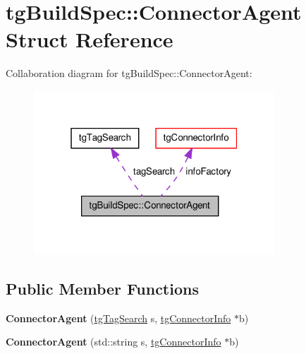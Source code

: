 \hypertarget{structtg_build_spec_1_1_connector_agent}{\section{tg\-Build\-Spec\-:\-:Connector\-Agent Struct Reference}
\label{structtg_build_spec_1_1_connector_agent}
}


Collaboration diagram for tg\-Build\-Spec\-:\-:Connector\-Agent\-:\nopagebreak
\begin{figure}[H]
\begin{center}
\leavevmode
\includegraphics[width=256pt]{structtg_build_spec_1_1_connector_agent__coll__graph}
\end{center}
\end{figure}
\subsection*{Public Member Functions}
\begin{DoxyCompactItemize}
\item 
\hypertarget{structtg_build_spec_1_1_connector_agent_a492d3ea5402b53ad66f2aec8d4ff47a7}{{\bfseries Connector\-Agent} (\hyperlink{classtg_tag_search}{tg\-Tag\-Search} s, \hyperlink{classtg_connector_info}{tg\-Connector\-Info} $\ast$b)}\label{structtg_build_spec_1_1_connector_agent_a492d3ea5402b53ad66f2aec8d4ff47a7}

\item 
\hypertarget{structtg_build_spec_1_1_connector_agent_a29fad7c37cb0ae22981ba74b47ad0bba}{{\bfseries Connector\-Agent} (std\-::string s, \hyperlink{classtg_connector_info}{tg\-Connector\-Info} $\ast$b)}\label{structtg_build_spec_1_1_connector_agent_a29fad7c37cb0ae22981ba74b47ad0bba}

\end{DoxyCompactItemize}

